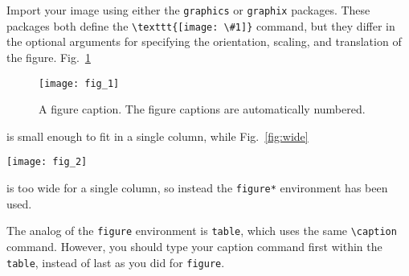 \documentclass[%
 aapm,
 mph,%
 amsmath,amssymb,
preprint,%
 reprint,%
]{revtex4-2}
\begin{document}
Import your image using either the \texttt{graphics} or
\texttt{graphix} packages. These packages both define the
\verb+\texttt{[image: \#1]}+ command, but they differ in the optional
arguments for specifying the orientation, scaling, and translation of the figure.
Fig.~\ref{fig:epsart}%
\begin{figure}
  \texttt{[image: fig\_1]}%
  \caption{\label{fig:epsart} A figure caption. The figure captions are
    automatically numbered.}
\end{figure}
is small enough to fit in a single column, while
Fig.~\ref{fig:wide}%
\begin{figure*}
  \texttt{[image: fig\_2]}%
  \caption{\label{fig:wide}Use the \texttt{figure*} environment to get a wide
    figure, spanning the page in \texttt{twocolumn} formatting.}
\end{figure*}
is too wide for a single column,
so instead the \texttt{figure*} environment has been used.

The analog of the \texttt{figure} environment is \texttt{table}, which uses
the same \verb+\caption+ command.
However, you should type your caption command first within the \texttt{table},
instead of last as you did for \texttt{figure}.
\end{document}
